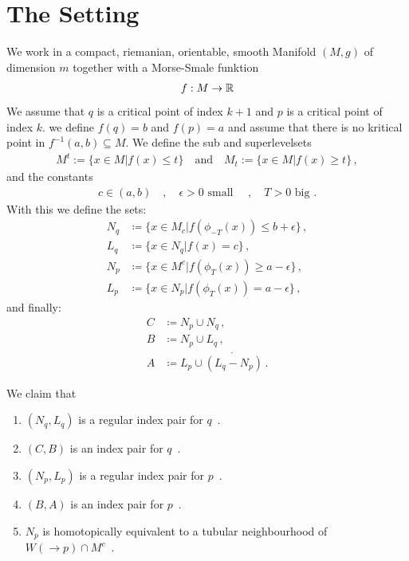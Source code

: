 \pagestyle{empty}

\section*{The Setting}
We work in a compact, riemanian, orientable, smooth Manifold $(M,g)$ of dimension $m$ together with a Morse-Smale funktion 
\begin{align}
    f: M\to \mathbb{R}
\end{align}
We assume that $q$ is a critical point of index $k+1$ and $p$ is a critical point of index $k$. we define $f(q)=b$ and $f(p)=a$ and assume that there is no kritical point in $f^{-1}(a,b)\subseteq M$. We define the sub and superlevelsets 
\begin{align}
    M^t:=\{ x\in M | f(x)\leq t \} \quad \text{and}\quad M_t:=\{ x\in M | f(x)\geq t \} \, ,
\end{align} and the constants 
\begin{align}
    c \in (a,b) \quad , \quad \epsilon >0 \text{ small } \quad,\quad T>0 \text{ big .}
\end{align} With this we define the sets: 
\begin{align}
	N_q  & \coloneq    \{ x\in M_c |f(\phi_{-T}(x))  \leq b+ \epsilon  \}   \, ,  \\
	L_q  & \coloneq    \{ x\in N_q |f(x)             =    c            \}    \, , \\
	N_p  & \coloneq    \{ x\in M^c |f(\phi_T(x))     \geq a-\epsilon   \}    \, , \\
	L_p  & \coloneq    \{ x\in N_p |f( \phi_T(x))    =    a-\epsilon   \} \, ,
\end{align} and finally: 
\begin{align}
	C  & \coloneq  N_p \cup N_q  \, ,                     \\
	B  & \coloneq  N_p \cup L_q   \, ,                   \\
	A  & \coloneq  L_p \cup \mathring{(L_q-N_p)} \, .
\end{align}
\begin{lemma}\label{lem: The Main Lemma Np is tubular}
    We claim that 
    \begin{enumerate}
	\item $(N_q,L_q)$ is a regular index pair for $q$\, . \label{lem: enum: 1}
	\item $(C,B)$ is an index pair for $q$\, .\label{lem: enum: 2}
	\item $(N_p,L_p)$ is a regular index pair for $p$\, .\label{lem: enum: 3}
	\item $(B,A)$ is an index pair for $p$\, .\label{lem: enum: 4}
    \item $N_p$ is homotopically equivalent to a tubular neighbourhood of $W(\to p)\cap M^c$\, .\label{lem: enum: 5}
\end{enumerate}
\end{lemma}

